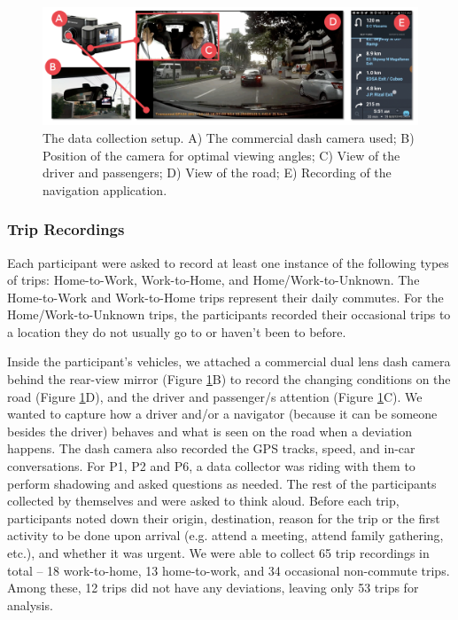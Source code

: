 \begin{figure}[t]
  \centering
  \includegraphics[scale=0.82]{figures/s1-data-collection-setup.png}
  \caption{The data collection setup. A) The commercial dash camera used; B) Position of the camera for optimal viewing angles; C) View of the driver and passengers; D) View of the road; E) Recording of the navigation application.}
  \label{fig:s1-setup}
\end{figure}

\subsubsection{Trip Recordings}
Each participant were asked to record at least one instance of the following types of trips: Home-to-Work, Work-to-Home, and Home/Work-to-Unknown. The Home-to-Work and Work-to-Home trips represent their daily commutes. For the Home/Work-to-Unknown trips, the participants recorded their occasional trips to a location they do not usually go to or haven't been to before. 

Inside the participant's vehicles, we attached a commercial dual lens dash camera behind the rear-view mirror (Figure \ref{fig:s1-setup}B) to record the changing conditions on the road (Figure \ref{fig:s1-setup}D), and the driver and passenger/s attention (Figure \ref{fig:s1-setup}C). We wanted to capture how a driver and/or a navigator (because it can be someone besides the driver) behaves and what is seen on the road when a deviation happens. The dash camera also recorded the GPS tracks, speed, and in-car conversations. For P1, P2 and P6, a data collector was riding with them to perform shadowing and asked questions as needed. The rest of the participants collected by themselves and were asked to think aloud. Before each trip, participants noted down their origin, destination, reason for the trip or the first activity to be done upon arrival (e.g. attend a meeting, attend family gathering, etc.), and whether it was urgent. We were able to collect 65 trip recordings in total -- 18 work-to-home, 13 home-to-work, and 34 occasional non-commute trips. Among these, 12 trips did not have any deviations, leaving only 53 trips for analysis. 


